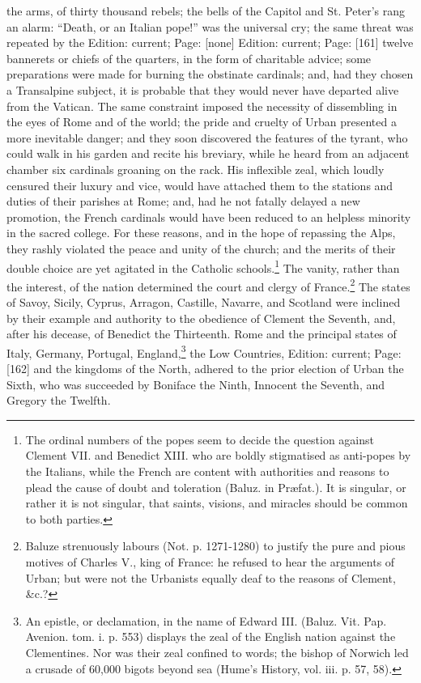 the arms, of thirty thousand rebels; the bells of the Capitol and St. Peter\texthebrew{}’s rang an alarm: \texthebrew{“}Death, or an Italian pope!\texthebrew{}” was the universal cry; the same threat was repeated by the Edition: current; Page: [none] Edition: current; Page: [161] twelve bannerets or chiefs of the quarters, in the form of charitable advice; some preparations were made for burning the obstinate cardinals; and, had they chosen a Transalpine subject, it is probable that they would never have departed alive from the Vatican. The same constraint imposed the necessity of dissembling in the eyes of Rome and of the world; the pride and cruelty of Urban presented a more inevitable danger; and they soon discovered the features of the tyrant, who could walk in his garden and recite his breviary, while he heard from an adjacent chamber six cardinals groaning on the rack. His inflexible zeal, which loudly censured their luxury and vice, would have attached them to the stations and duties of their parishes at Rome; and, had he not fatally delayed a new promotion, the French cardinals would have been reduced to an helpless minority in the sacred college. For these reasons, and in the hope of repassing the Alps, they rashly violated the peace and unity of the church; and the merits of their double choice are yet agitated in the Catholic schools.\footnote{The ordinal numbers of the popes seem to decide the question against Clement VII. and Benedict XIII. who are boldly stigmatised as anti-popes by the Italians, while the French are content with authorities and reasons to plead the cause of doubt and toleration (Baluz. in Præfat.). It is singular, or rather it is not singular, that saints, visions, and miracles should be common to both parties.} The vanity, rather than the interest, of the nation determined the court and clergy of France.\footnote{Baluze strenuously labours (Not. p. 1271-1280) to justify the pure and pious motives of Charles V., king of France: he refused to hear the arguments of Urban; but were not the Urbanists equally deaf to the reasons of Clement, \&c.?} The states of Savoy, Sicily, Cyprus, Arragon, Castille, Navarre, and Scotland were inclined by their example and authority to the obedience of Clement the Seventh, and, after his decease, of Benedict the Thirteenth. Rome and the principal states of Italy, Germany, Portugal, England,\footnote{An epistle, or declamation, in the name of Edward III. (Baluz. Vit. Pap. Avenion. tom. i. p. 553) displays the zeal of the English nation against the Clementines. Nor was their zeal confined to words; the bishop of Norwich led a crusade of 60,000 bigots beyond sea (Hume\texthebrew{}’s History, vol. iii. p. 57, 58).} the Low Countries, Edition: current; Page: [162] and the kingdoms of the North, adhered to the prior election of Urban the Sixth, who was succeeded by Boniface the Ninth, Innocent the Seventh, and Gregory the Twelfth.

